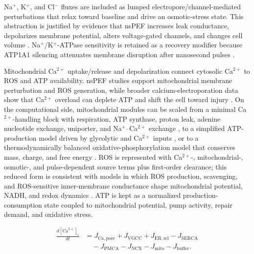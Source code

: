 Na$^+$, K$^+$, and Cl$^-$ fluxes are included as lumped electropore/channel-mediated perturbations that relax toward baseline and drive an osmotic-stress state. This abstraction is justified by evidence that nsPEF increases leak conductance, depolarizes membrane potential, alters voltage-gated channels, and changes cell volume \cite{pakhomov2007membrane,smith2011transmembrane,burke2017nanosecond,yang2021regulation}. Na$^+$/K$^+$-ATPase sensitivity is retained as a recovery modifier because ATP1A1 silencing attenuates membrane disruption after nanosecond pulses \cite{silkuniene2023silencing}.

Mitochondrial Ca$^{2+}$ uptake/release and depolarization connect cytosolic Ca$^{2+}$ to ROS and ATP availability. nsPEF studies support mitochondrial membrane perturbation and ROS generation, while broader calcium-electroporation data show that Ca$^{2+}$ overload can deplete ATP and shift the cell toward injury \cite{beebe2012transient,napotnik2012mitochondrial,pakhomova2012oxidative,nuccitelli2013reactive,radzeviciute2024calcium,gibot2020calcium}. On the computational side, mitochondrial modules can be scaled from a minimal Ca$^{2+}$-handling block with respiration, ATP synthase, proton leak, adenine nucleotide exchange, uniporter, and Na$^+$--Ca$^{2+}$ exchange \cite{magnus1997minimal}, to a simplified ATP-production model driven by glycolytic and Ca$^{2+}$ inputs \cite{bertram2006simplified}, or to a thermodynamically balanced oxidative-phosphorylation model that conserves mass, charge, and free energy \cite{beard2005biophysical}. ROS is represented with Ca$^{2+}$-, mitochondrial-, osmotic-, and pulse-dependent source terms plus first-order clearance; this reduced form is consistent with models in which ROS production, scavenging, and ROS-sensitive inner-membrane conductance shape mitochondrial potential, NADH, and redox dynamics \cite{cortassa2004mitochondrial,murphy2016mitochondrial,zhang2022crosstalk}. ATP is kept as a normalized production-consumption state coupled to mitochondrial potential, pump activity, repair demand, and oxidative stress.

\begin{equation}
\begin{aligned}
\frac{d[\mathrm{Ca}^{2+}]_i}{dt} &=
J_{\mathrm{Ca,pore}} + J_{\mathrm{VGCC}} + J_{\mathrm{ER,rel}} - J_{\mathrm{SERCA}} \\
&\quad - J_{\mathrm{PMCA}} - J_{\mathrm{NCX}} - J_{\mathrm{mito}} - J_{\mathrm{buffer}} .
\end{aligned}
\end{equation}


